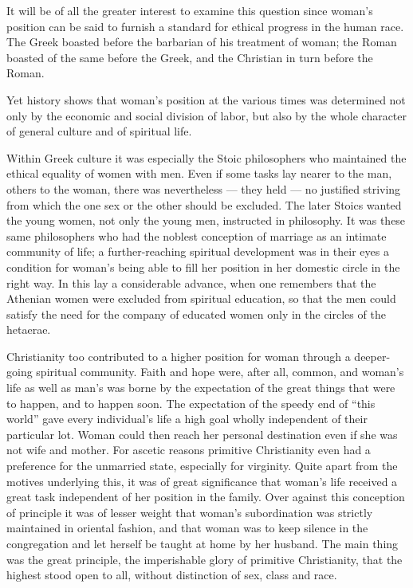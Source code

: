 \documentclass[12pt,a4paper,openany]{book}
\newcommand{\opage}[1]{\marginnote{\footnotesize\textit{[#1]}}}
\begin{document}
It will be of all the greater interest to examine this question since woman's position can be said to furnish a standard
for ethical progress in the human race. The Greek boasted before the barbarian of his treatment of woman; the Roman
boasted of the same before the Greek, and the Christian in turn before the Roman.

Yet history shows that woman's position at the various times was determined not only by the economic and social
division of labor, but also by the whole character of general culture and of spiritual life.

Within Greek culture it was especially the Stoic philosophers who maintained the ethical equality of women with men.
Even if some tasks lay nearer to the man, others to the woman, there was nevertheless --- they held --- no justified
striving from which the one sex or the other should be excluded. The later Stoics wanted the young women, not only the
young men, instructed in philosophy. It was these same philosophers who had the noblest conception of marriage as an
intimate community of life; a further-reaching spiritual development was in
\opage{314}their eyes a condition for woman's being able to fill her position in her domestic circle in the right way.
In this lay a considerable advance, when one remembers that the Athenian women were excluded from spiritual education,
so that the men could satisfy the need for the company of educated women only in the circles of the hetaerae.

Christianity too contributed to a higher position for woman through a deeper-going spiritual community. Faith and hope
were, after all, common, and woman's life as well as man's was borne by the expectation of the great things that were to
happen, and to happen soon. The expectation of the speedy end of ``this world'' gave every individual's life a high goal
wholly independent of their particular lot. Woman could then reach her personal destination even if she was not wife
and mother. For ascetic reasons primitive Christianity even had a preference for the unmarried state, especially for
virginity. Quite apart from the motives underlying this, it was of great significance that woman's life received a great
task independent of her position in the family. Over against this conception of principle it was of lesser weight that
woman's subordination was strictly maintained in oriental fashion, and that woman was to keep silence in the congregation
and let herself be taught at home by her husband. The main thing was the great principle, the imperishable glory of
primitive Christianity, that the highest stood open to all, without distinction of sex, class and race.
\end{document}
